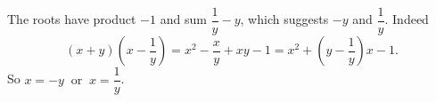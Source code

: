 The roots have product $-1$ and sum $\dfrac1y-y$, which suggests $-y$ and $\dfrac1y$. Indeed
\[(x+y)\left(x-\dfrac1y\right)=x^2-\dfrac xy+xy-1=x^2+\left(y-\dfrac1y\right)x-1.\]
So $\boxed{x=-y\ \text{ or }\ x=\dfrac1y}$.
